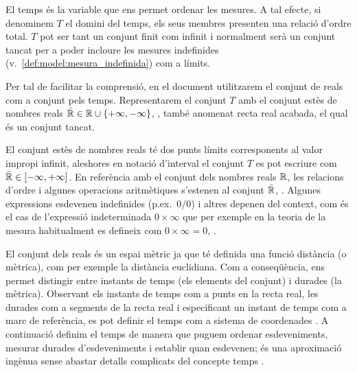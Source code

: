 El temps és la variable que ens permet ordenar les mesures.  A tal
efecte, si denominem $T$ el domini del temps, els seus membres
presenten una relació d'ordre total. $T$ pot ser tant un conjunt finit
com infinit i normalment serà un conjunt tancat %
per a poder incloure les mesures indefinides (v.\
\autoref{def:model:mesura_indefinida}) com a límits.

Per tal de facilitar la comprensió, en el document utilitzarem el
conjunt de reals com a conjunt pels temps. Representarem el conjunt
$T$ amb el conjunt estès de nombres reals $\bar{\mathbb{R}{}} \in
\mathbb{R}{} \cup
\{+\infty,-\infty\}$, \parencite{wiki:extendedreal,cantrell:extendedreal},
també anomenat recta real acabada, el qual és un conjunt tancat.

El conjunt estès de nombres reals té dos punts límits corresponents al
valor impropi infinit, aleshores en notació d'interval el conjunt $T$
es pot escriure com $\bar{\mathbb{R}{}} \in [-\infty,+\infty]$. En referència
amb el conjunt dels nombres reals $\mathbb{R}{}$, les relacions d'ordre i
algunes operacions aritmètiques s'estenen al conjunt $\bar{\mathbb{R}{}}$,
\cite{cantrell:extendedreal}.  Algunes expressions esdevenen
indefinides (p.ex.\ $0/0$) i altres depenen del context, com és el cas
de l'expressió indeterminada $0 \times \infty$ que per exemple en la
teoria de la mesura habitualment es defineix com $0 \times \infty =
0$, \cite{wiki:extendedreal}.


El conjunt dels reals és un espai mètric ja que té definida una funció
distància (o mètrica), com per exemple la distància euclidiana. Com a
conseqüència, ens permet distingir entre instants de temps (els
elements del conjunt) i durades (la mètrica). Observant els instants
de temps com a punts en la recta real, les durades com a segments de
la recta real i especificant un instant de temps com a marc de
referència, es pot definir el temps com a sistema de
coordenades \parencite{iep:time-supplement,kopetz11:realtime}. A
continuació definim el temps de manera que puguem ordenar
esdeveniments, mesurar durades d'esdeveniments i establir quan
esdevenen; és una aproximació ingènua sense abastar detalls complicats
del concepte temps \parencite{iep:time}.





